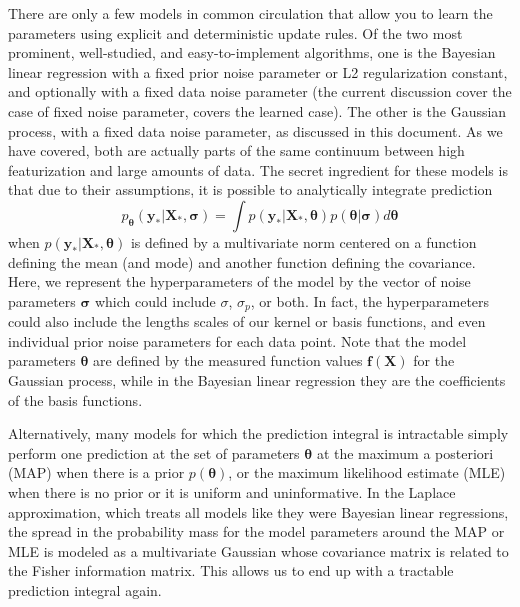 \documentclass{article}
\begin{document}
There are only a few models in common circulation that allow you to learn the parameters using explicit and deterministic update rules. Of the two most prominent, well-studied, and easy-to-implement algorithms, one is the Bayesian linear regression with a fixed prior noise parameter or L2 regularization constant, and optionally with a fixed data noise parameter (the current discussion cover the case of fixed noise parameter, \cite{KoyoteScience} covers the learned case). The other is the Gaussian process, with a fixed data noise parameter, as discussed in this document. As we have covered, both are actually parts of the same continuum between high featurization and large amounts of data.  The secret ingredient for these models is that due to their assumptions, it is possible to analytically integrate prediction 
\begin{equation}
    p_{\boldsymbol{\theta}}(\mathbf{y}_\ast|\mathbf{X}_\ast,\boldsymbol{\sigma}) = \int p(\mathbf{y}_\ast|\mathbf{X}_\ast,\boldsymbol{\theta})p(\boldsymbol{\theta}|\boldsymbol{\sigma})d\boldsymbol{\theta}
\end{equation}when $p(\mathbf{y}_\ast|\mathbf{X}_\ast,\boldsymbol{\theta})$ is defined by a multivariate norm centered on a function defining the mean (and mode) and another function defining the covariance. Here, we represent the hyperparameters of the model by the vector of noise parameters $\boldsymbol{\sigma}$ which could include $\sigma$, $\sigma_p$, or both. In fact, the hyperparameters could also include the lengths scales of our kernel or basis functions, and even individual prior noise parameters for each data point. Note that the model parameters $\boldsymbol{\theta}$ are defined by the measured function values $\mathbf{f}(\mathbf{X})$ for the Gaussian process, while in the Bayesian linear regression they are the coefficients of the basis functions.  

Alternatively, many models for which the prediction integral is intractable simply perform one prediction at the set of parameters $\boldsymbol{\theta}$ at the maximum a posteriori (MAP) when there is a prior $p(\boldsymbol{\theta})$, or the maximum likelihood estimate (MLE) when there is no prior or it is uniform and uninformative. In the Laplace approximation, which treats all models like they were Bayesian linear regressions, the spread in the probability mass for the model parameters around the MAP or MLE is modeled as a multivariate Gaussian whose covariance matrix is related to the Fisher information matrix. This allows us to end up with a tractable prediction integral again.
\end{document}
